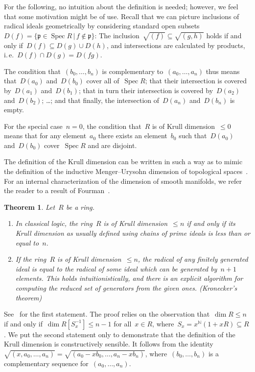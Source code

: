\documentclass[10pt,reqno,a4paper]{amsbook}
\makeatletter
\theoremstyle{definition}
\theoremstyle{plain}
\newtheorem{thm}[defn]{Theorem}
\theoremstyle{remark}
\newcommand{\NN}{\mathbb{N}}
\newcommand{\ppp}{\mathfrak{p}}
\DeclareMathOperator{\Spec}{Spec}
\newcommand{\?}{\,{:}\,}
\renewcommand{\_}{\mathpunct{.}\,}
\newcommand{\ie}{i.\,e.\@\xspace}
\renewenvironment{proof}[1][\proofname]{\par
  \pushQED{\qed}%
  \normalfont \topsep6\p@\@plus6\p@\relax
  \trivlist
  \item[\hskip\labelsep
        \itshape
    #1\@addpunct{.}]\ignorespaces
}{%
  \popQED\endtrivlist\@endpefalse
}
\makeatother
\begin{document}
For the following, no intuition about the definition is needed; however, we
feel that some motivation might be of use. Recall that we can picture inclusions of
radical ideals geometrically by considering standard open subsets~$D(f) = \{
\ppp \in \Spec R \,|\, f \not\in \ppp \}$: The inclusion~$\sqrt{(f)} \subseteq
\sqrt{(g,h)}$ holds if and only if~$D(f) \subseteq D(g) \cup D(h)$, and
intersections are calculated by products, \ie~$D(f) \cap D(g) = D(fg)$.

The condition that~$(b_0,\ldots,b_n)$ is complementary to~$(a_0,\ldots,a_n)$
thus means that~$D(a_0)$ and~$D(b_0)$ cover all of~$\Spec R$; that their
intersection is covered by~$D(a_1)$ and~$D(b_1)$; that in turn their
intersection is covered by~$D(a_2)$ and~$D(b_2)$; \ldots; and that finally, the
intersection of~$D(a_n)$ and~$D(b_n)$ is empty.

For the special case~$n = 0$, the condition that~$R$ is of Krull
dimension~$\leq 0$ means that for any element~$a_0$ there exists an
element~$b_0$ such that~$D(a_0)$ and~$D(b_0)$ cover~$\Spec R$ and are disjoint.

The definition of the Krull dimension can be written in such a way as to mimic the
definition of the inductive Menger--Urysohn dimension of topological
spaces~\cite[Section~1]{dyn:krull-integral}. For an internal characterization
of the dimension of smooth manifolds, we refer the reader to a result of
Fourman~\cite[Section~3]{fourman:reals}.

\begin{thm}Let~$R$ be a ring.
\begin{enumerate}
\item In classical logic, the ring~$R$ is
of Krull dimension~$\leq n$ if and only if its Krull dimension
as usually defined using chains of prime ideals is less than or equal to~$n$.
\item If the ring~$R$ is
of Krull dimension~$\leq n$, the radical of any finitely generated ideal is
equal to the radical of some ideal which can be generated by~$n+1$ elements.
This holds intuitionistically, and there is an explicit algorithm for computing
the reduced set of generators from the given ones. (Kronecker's theorem)
\end{enumerate}
\end{thm}
\begin{proof}See~\cite[Theorem~1.2]{dyn:krull-integral} for the first
statement. The proof relies on the observation that~$\dim R \leq n$ if and only
if~$\dim R[S_x^{-1}] \leq n-1$ for all~$x \in R$, where~$S_x = x^\NN (1+xR)
\subseteq R$. We put the second statement only to demonstrate that the
definition of the Krull dimension is constructively sensible. It follows from
the identity~$\sqrt{(x,a_0,\ldots,a_n)} =
\sqrt{(a_0-xb_0,\ldots,a_n-xb_n)}$, where~$(b_0,\ldots,b_n)$ is a complementary
sequence for~$(a_0,\ldots,a_n)$.
\end{proof}
\end{document}
